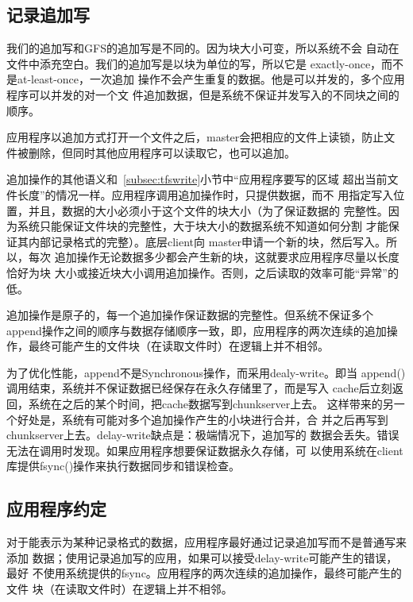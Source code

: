 \documentclass[11pt,a4paper]{scrartcl}
\begin{document}
\begin{CJK*}{UTF8}{gbsn}
\subsection{记录追加写}
我们的追加写和GFS的追加写是不同的。因为块大小可变，所以系统不会
自动在文件中添充空白。我们的追加写是以块为单位的写，所以它是
exactly-once，而不是at-least-once，一次追加
操作不会产生重复的数据。他是可以并发的，多个应用程序可以并发的对一个文
件追加数据，但是系统不保证并发写入的不同块之间的顺序。

应用程序以追加方式打开一个文件之后，master会把相应的文件上读锁，防止文
件被删除，但同时其他应用程序可以读取它，也可以追加。

追加操作的其他语义和~\ref{subsec:tfswrite}小节中“应用程序要写的区域
超出当前文件长度”的情况一样。应用程序调用追加操作时，只提供数据，而不
用指定写入位置，并且，数据的大小必须小于这个文件的块大小（{\color{red}为了保证数据的
完整性。因为系统只能保证文件块的完整性，大于块大小的数据系统不知道如何分割
才能保证其内部记录格式的完整}）。底层client向
master申请一个新的块，然后写入。所以，每次
追加操作无论数据多少都会产生新的块，这就要求应用程序尽量以长度恰好为块
大小或接近块大小调用追加操作。否则，之后读取的效率可能“异常”的低。

{\color{red}
追加操作是原子的，每一个追加操作保证数据的完整性。但系统不保证多个
append操作之间的顺序与数据存储顺序一致，即，应用程序的两次连续的追加操
作，最终可能产生的文件块（在读取文件时）在逻辑上并不相邻。

为了优化性能，append不是Synchronous操作，而采用dealy-write。即当
append()调用结束，系统并不保证数据已经保存在永久存储里了，而是写入
cache后立刻返回，系统在之后的某个时间，把cache数据写到chunkserver上去。
这样带来的另一个好处是，系统有可能对多个追加操作产生的小块进行合并，合
并之后再写到chunkserver上去。delay-write缺点是：极端情况下，追加写的
数据会丢失。错误无法在调用时发现。如果应用程序想要保证数据永久存储，可
以使用系统在client库提供fsync()操作来执行数据同步和错误检查。
}
\subsection{应用程序约定}
对于能表示为某种记录格式的数据，应用程序最好通过记录追加写而不是普通写来添加
数据；{\color{red}使用记录追加写的应用，如果可以接受delay-write可能产生的错误，最好
不使用系统提供的fsync。}应用程序的两次连续的追加操作，最终可能产生的文件
块（在读取文件时）在逻辑上并不相邻。
\end{CJK*}
\end{document}
